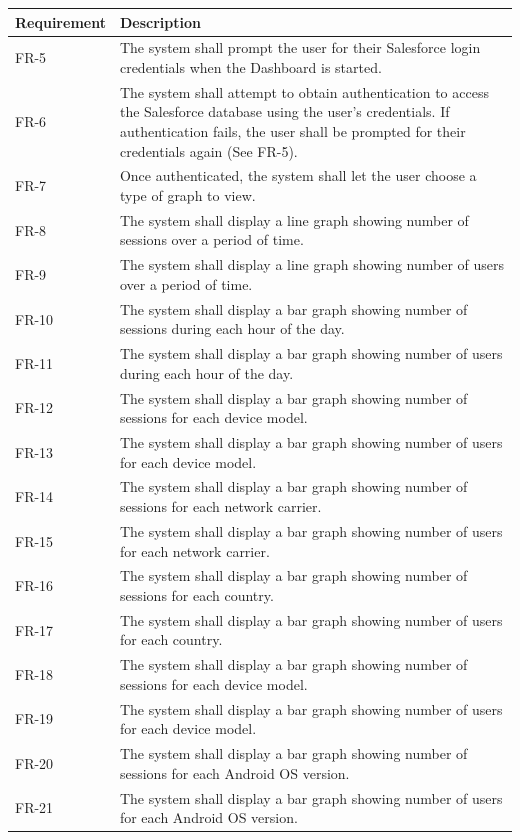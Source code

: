 \documentclass[12pt,oneside,letterpaper]{article}
\begin{document}
\begin{longtable}{|l|p{3.8in}|}
\hline
\textbf{Requirement}&\textbf{Description}\\
\hline
FR-5&The system shall prompt the user for their Salesforce login credentials when the Dashboard is started.\\
\hline
FR-6&The system shall attempt to obtain authentication to access the Salesforce database using the user's credentials. 
If authentication fails, the user shall be prompted for their credentials again (See FR-5).\\
\hline
FR-7&Once authenticated, the system shall let the user choose a type of graph to view.\\
\hline
FR-8&The system shall display a line graph showing number of sessions over a period of time.\\
\hline
FR-9&The system shall display a line graph showing number of users over a period of time.\\
\hline
FR-10&The system shall display a bar graph showing number of sessions during each hour of the day.\\
\hline
FR-11&The system shall display a bar graph showing number of users during each hour of the day.\\
\hline
FR-12&The system shall display a bar graph showing number of sessions for each device model.\\
\hline
FR-13&The system shall display a bar graph showing number of users for each device model.\\
\hline
FR-14&The system shall display a bar graph showing number of sessions for each network carrier.\\
\hline
FR-15&The system shall display a bar graph showing number of users for each network carrier.\\
\hline
FR-16&The system shall display a bar graph showing number of sessions for each country.\\
\hline
FR-17&The system shall display a bar graph showing number of users for each country.\\
\hline
FR-18&The system shall display a bar graph showing number of sessions for each device model.\\
\hline
FR-19&The system shall display a bar graph showing number of users for each device model.\\
\hline
FR-20&The system shall display a bar graph showing number of sessions for each Android OS version.\\
\hline
FR-21&The system shall display a bar graph showing number of users for each Android OS version.\\

\end{longtable}
\end{document}
